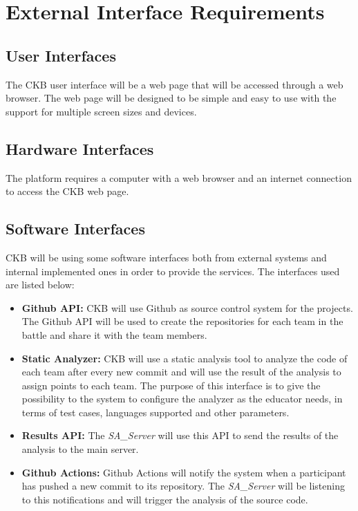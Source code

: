 
\section{External Interface Requirements}
\label{s:External_interface_requirements}%

\subsection{User Interfaces}
\label{ss:User_interfaces}%

The CKB user interface will be a web page that will be accessed through a web browser. The web page will be designed to be simple and easy to use with the support for multiple screen sizes and devices.

\subsection{Hardware Interfaces}
\label{ss:Hardware_interfaces}%

The platform requires a computer with a web browser and an internet connection to access the CKB web page. 

\subsection{Software Interfaces}
\label{ss:Software_interfaces}%

CKB will be using some software interfaces both from external systems and internal implemented ones in order to provide the services. The interfaces used are listed below:
\begin{itemize}
  \item \textbf{Github API:} CKB will use Github as source control system for the projects. The Github API will be used to create the repositories for each team in the battle and share it with the team members.
  \item \textbf{Static Analyzer:} CKB will use a static analysis tool to analyze the code of each team after every new commit and will use the result of the analysis to assign points to each team. The purpose of this interface is to give the possibility to the system to configure the analyzer as the educator needs, in terms of test cases, languages supported and other parameters.
  \item \textbf{Results API: } The \textit{SA\_Server} will use this API to send the results of the analysis to the main server.
  \item \textbf{Github Actions: } Github Actions will notify the system when a participant has pushed a new commit to its repository. The \textit{SA\_Server} will be listening to this notifications and will trigger the analysis of the source code.
\end{itemize}

